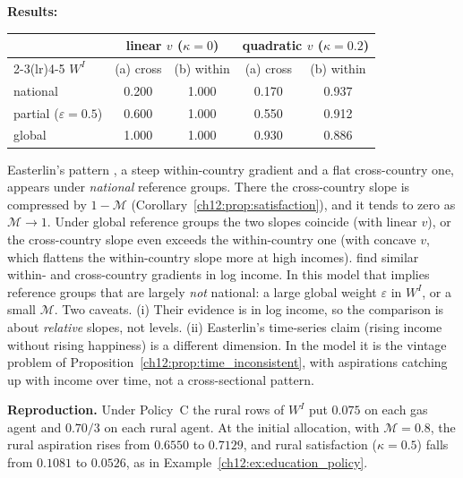 \documentclass[../solutions_manual.tex]{subfiles}
\begin{document}
\textbf{Results:}
\begin{center}
\small
\begin{tabular}{lcccc}
\toprule
& \multicolumn{2}{c}{linear $v$ ($\kappa = 0$)} & \multicolumn{2}{c}{quadratic $v$ ($\kappa = 0.2$)} \\
\cmidrule(lr){2-3}\cmidrule(lr){4-5}
$W^I$ & (a) cross & (b) within & (a) cross & (b) within \\
\midrule
national & 0.200 & 1.000 & 0.170 & 0.937 \\
partial ($\varepsilon = 0.5$) & 0.600 & 1.000 & 0.550 & 0.912 \\
global & 1.000 & 1.000 & 0.930 & 0.886 \\
\bottomrule
\end{tabular}
\end{center}
Easterlin's pattern \citep{easterlin1974does}, a steep within-country gradient and a flat cross-country one, appears under \emph{national} reference groups. There the cross-country slope is compressed by $1 - \mathcal{M}$ (Corollary~\ref{ch12:prop:satisfaction}), and it tends to zero as $\mathcal{M} \to 1$. Under global reference groups the two slopes coincide (with linear $v$), or the cross-country slope even exceeds the within-country one (with concave $v$, which flattens the within-country slope more at high incomes). \citet{stevenson2008economic} find similar within- and cross-country gradients in log income. In this model that implies reference groups that are largely \emph{not} national: a large global weight $\varepsilon$ in $W^I$, or a small $\mathcal{M}$. Two caveats. (i) Their evidence is in log income, so the comparison is about \emph{relative} slopes, not levels. (ii) Easterlin's time-series claim (rising income without rising happiness) is a different dimension. In the model it is the vintage problem of Proposition~\ref{ch12:prop:time_inconsistent}, with aspirations catching up with income over time, not a cross-sectional pattern.

\textbf{Reproduction.} Under Policy~C the rural rows of $W^I$ put $0.075$ on each gas agent and $0.70/3$ on each rural agent. At the initial allocation, with $\mathcal{M} = 0.8$, the rural aspiration rises from $0.6550$ to $0.7129$, and rural satisfaction ($\kappa = 0.5$) falls from $0.1081$ to $0.0526$, as in Example~\ref{ch12:ex:education_policy}.
\end{document}
